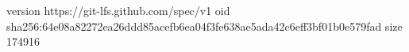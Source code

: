 version https://git-lfs.github.com/spec/v1
oid sha256:64e08a82272ea26ddd85acefb6ea04f3fe638ae5ada42c6eff3bf01b0e579fad
size 174916
